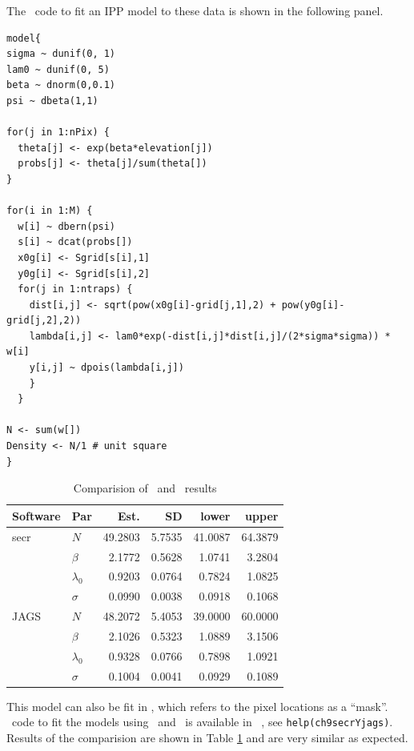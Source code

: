 The \bugs~code to fit an IPP model to these data is shown in
the following panel.

\begin{small}
\begin{verbatim}
model{
sigma ~ dunif(0, 1)
lam0 ~ dunif(0, 5)
beta ~ dnorm(0,0.1)
psi ~ dbeta(1,1)

for(j in 1:nPix) {
  theta[j] <- exp(beta*elevation[j])
  probs[j] <- theta[j]/sum(theta[])
}

for(i in 1:M) {
  w[i] ~ dbern(psi)
  s[i] ~ dcat(probs[])
  x0g[i] <- Sgrid[s[i],1]
  y0g[i] <- Sgrid[s[i],2]
  for(j in 1:ntraps) {
    dist[i,j] <- sqrt(pow(x0g[i]-grid[j,1],2) + pow(y0g[i]-grid[j,2],2))
    lambda[i,j] <- lam0*exp(-dist[i,j]*dist[i,j]/(2*sigma*sigma)) * w[i]
    y[i,j] ~ dpois(lambda[i,j])
    }
  }

N <- sum(w[])
Density <- N/1 # unit square
}
\end{verbatim}
\end{small}


\begin{table}[b]
\centering
\caption{Comparision of \secr~and \jags~results}
\begin{tabular}{llrrrr}
\hline
Software & Par & Est. & SD & lower & upper \\
\hline
 secr & $N$ & 49.2803 & 5.7535 & 41.0087 & 64.3879 \\
      & $\beta$ &  2.1772 & 0.5628 &  1.0741 &  3.2804 \\
      & $\lambda_0$ &  0.9203 & 0.0764 &  0.7824 &  1.0825 \\
      & $\sigma$ &  0.0990 & 0.0038 &  0.0918 &  0.1068 \\
 JAGS & $N$ & 48.2072 & 5.4053 & 39.0000 & 60.0000 \\
      & $\beta$ &  2.1026 & 0.5323 &  1.0889 &  3.1506 \\
      & $\lambda_0$ &  0.9328 & 0.0766 &  0.7898 &  1.0921 \\
      & $\sigma$ &  0.1004 & 0.0041 &  0.0929 &  0.1089 \\
\hline
\end{tabular}
\label{ch9:tab:secrYjags}
\end{table}


This model can also be fit in \secr, which refers
to the pixel locations as a ``mask''. \R~code to
fit the models using \secr~and \jags~is available in \scrbook~, see
\verb#help(ch9secrYjags)#. Results of the
comparision are shown in Table \ref{ch9:tab:secrYjags} and are
very similar as expected.

